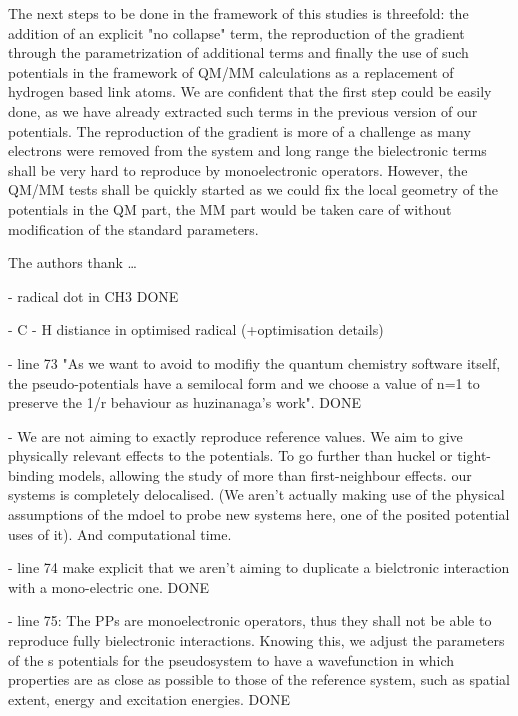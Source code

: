 \documentclass[journal=jctcce,manuscript=article]{achemso}
\begin{document}
The next steps to be done in the framework of this studies is threefold: the addition of an explicit
"no collapse" term, the reproduction of the gradient through the parametrization
of additional terms and finally the use of such potentials in the framework
of QM/MM calculations as a replacement of hydrogen based link atoms.
We are confident that the first step could be easily done, as we have already extracted such
terms in the previous version of our potentials.
The reproduction of the gradient is more of a challenge as many electrons were removed from the
system and long range the bielectronic terms shall be very hard to reproduce by monoelectronic
operators.
However, the QM/MM tests shall be quickly started as we could fix the local geometry of the potentials
in the QM part, the MM part would be taken care of without modification of the standard parameters.
\begin{acknowledgement}

The authors thank \ldots

\end{acknowledgement}

- radical dot in CH3 DONE

- C - H distiance in optimised radical (+optimisation details)

- line 73 "As we want to avoid to modifiy the quantum chemistry software itself, the pseudo-potentials have a semilocal form and we choose a value of n=1 to preserve the 1/r behaviour as huzinanaga's work". DONE

- We are not aiming to exactly reproduce reference values. We aim to give physically relevant effects to the potentials. To go further than huckel or tight-binding models, allowing the study of more than first-neighbour effects. our systems is completely delocalised. (We aren't actually making use of the physical assumptions of the mdoel to probe new systems here, one of the posited potential uses of it). And computational time.

- line 74 make explicit that we aren't aiming to duplicate a bielctronic interaction with a mono-electric one. DONE

- line 75: The PPs are monoelectronic operators, thus they shall not be able to reproduce fully bielectronic interactions. Knowing this, we adjust the parameters of the s potentials for the pseudosystem to have a wavefunction in which properties are as close as possible to those of the reference system, such as spatial extent, energy and excitation energies. DONE
\end{document}
